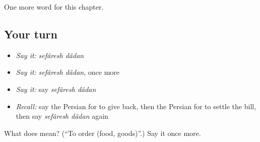 \begin{grammarlens}[title={What you've built}]
One more word for this chapter.
\end{grammarlens}

\subsection*{Your turn}
\begin{itemize}
\raggedright
  \item \emph{Say it:} \emph{sefâresh dâdan}
  \item \emph{Say it:} \emph{sefâresh dâdan}, once more
  \item \emph{Say it:} say \emph{sefâresh dâdan}
  \item \emph{Recall:} say the Persian for to give back, then the Persian for to settle the bill, then say \emph{sefâresh dâdan} again
\end{itemize}

\begin{tcolorbox}[breakable,colback=teal!4,colframe=teal!35!black,title={Before you move on}]
What does   mean? (\textquotedblleft{}To order (food, goods)\textquotedblright{}.) Say it once more.
\end{tcolorbox}
